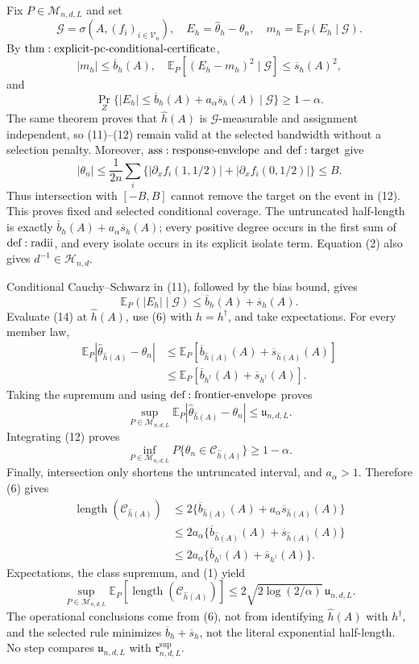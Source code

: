 Fix \(P\in\mathcal M_{n,d,L}\) and set
\[
 \mathcal G=\sigma\!\left(A,(f_i)_{i\in\mathcal V_n}\right),
 \quad E_h=\widehat\theta_h-\theta_n,
 \quad m_h=\mathbb E_P(E_h\mid\mathcal G).
\tag{10}
\]
By \({\rm thm:explicit\text{-}pc\text{-}conditional\text{-}certificate}\),
\[
 |m_h|\leq\overline b_h(A),\quad
 \mathbb E_P[(E_h-m_h)^2\mid\mathcal G]\leq\overline s_h(A)^2,
\tag{11}
\]
and
\[
 \Pr_Z\{|E_h|\leq\overline b_h(A)+a_\alpha\overline s_h(A)\mid\mathcal G\}
 \geq1-\alpha.
\tag{12}
\]
The same theorem proves that \(\widehat h(A)\) is \(\mathcal G\)-measurable and assignment independent, so (11)--(12) remain valid at the selected bandwidth without a selection penalty.  Moreover, \({\rm ass:response\text{-}envelope}\) and \({\rm def:target}\) give
\[
 |\theta_n|\leq\frac1{2n}\sum_i
 \{ |\partial_xf_i(1,1/2)|+|\partial_xf_i(0,1/2)|\}\leq B.
\tag{13}
\]
Thus intersection with \([-B,B]\) cannot remove the target on the event in (12).  This proves fixed and selected conditional coverage.  The untruncated half-length is exactly \(\overline b_h(A)+a_\alpha\overline s_h(A)\); every positive degree occurs in the first sum of \({\rm def:radii}\), and every isolate occurs in its explicit isolate term.  Equation (2) also gives \(d^{-1}\in\mathcal H_{n,d}\).

Conditional Cauchy--Schwarz in (11), followed by the bias bound, gives
\[
 \mathbb E_P(|E_h|\mid\mathcal G)
 \leq\overline b_h(A)+\overline s_h(A).
\tag{14}
\]
Evaluate (14) at \(\widehat h(A)\), use (6) with \(h=h^\dagger\), and take expectations.  For every member law,
\[
\begin{aligned}
 \mathbb E_P|\widehat\theta_{\widehat h(A)}-\theta_n|
 &\leq\mathbb E_P[\overline b_{\widehat h(A)}(A)+\overline s_{\widehat h(A)}(A)]\\
 &\leq\mathbb E_P[\overline b_{h^\dagger}(A)+\overline s_{h^\dagger}(A)].
\end{aligned}
\tag{15}
\]
Taking the supremum and using \({\rm def:frontier\text{-}envelope}\) proves
\[
 \sup_{P\in\mathcal M_{n,d,L}}
 \mathbb E_P|\widehat\theta_{\widehat h(A)}-\theta_n|
 \leq\mathfrak u_{n,d,L}.
\tag{16}
\]
Integrating (12) proves
\[
 \inf_{P\in\mathcal M_{n,d,L}}
 P\{\theta_n\in\mathcal C_{\widehat h(A)}\}\geq1-\alpha.
\tag{17}
\]
Finally, intersection only shortens the untruncated interval, and \(a_\alpha>1\).  Therefore (6) gives
\[
\begin{aligned}
 \operatorname{length}(\mathcal C_{\widehat h(A)})
 &\leq2\{\overline b_{\widehat h(A)}(A)+a_\alpha\overline s_{\widehat h(A)}(A)\}\\
 &\leq2a_\alpha\{\overline b_{\widehat h(A)}(A)+\overline s_{\widehat h(A)}(A)\}\\
 &\leq2a_\alpha\{\overline b_{h^\dagger}(A)+\overline s_{h^\dagger}(A)\}.
\end{aligned}
\tag{18}
\]
Expectations, the class supremum, and (1) yield
\[
 \sup_{P\in\mathcal M_{n,d,L}}
 \mathbb E_P[\operatorname{length}(\mathcal C_{\widehat h(A)})]
 \leq2\sqrt{2\log(2/\alpha)}\,\mathfrak u_{n,d,L}.
\tag{19}
\]
The operational conclusions come from (6), not from identifying \(\widehat h(A)\) with \(h^\dagger\), and the selected rule minimizes \(\overline b_h+\overline s_h\), not the literal exponential half-length.  No step compares \(\mathfrak u_{n,d,L}\) with \(\mathfrak r^{\mathrm{sup}}_{n,d,L}\).
